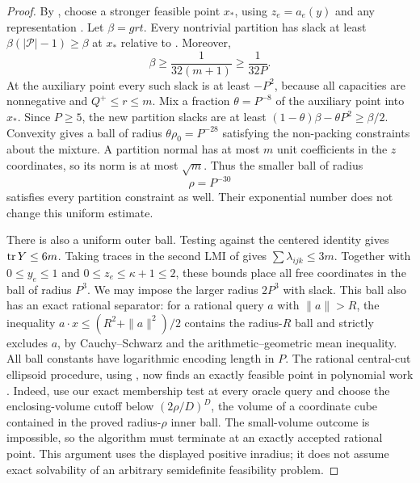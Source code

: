 \begin{proof}
By , choose a stronger feasible point $x_*$,
using $z_e=a_e(y)$ and any representation
. Let $\beta=grt$. Every nontrivial
partition has slack at least $\beta(|\mathcal P|-1)\ge\beta$ at $x_*$
relative to . Moreover,
\[
 \beta\ge\frac1{32(m+1)}\ge\frac1{32P}.
\]
At the auxiliary point every such slack is at least $-P^2$, because
all capacities are nonnegative and $Q^+\le r\le m$.
Mix a fraction $\theta=P^{-8}$ of the auxiliary point into $x_*$.
Since $P\ge5$, the new partition slacks are at least
$(1-\theta)\beta-\theta P^2\ge\beta/2$.
Convexity gives a ball of radius $\theta\rho_0=P^{-28}$ satisfying the
non-packing constraints about the mixture. A partition normal has at
most $m$ unit coefficients in the $z$ coordinates, so its norm is at
most $\sqrt m$. Thus the smaller ball of radius
\begin{equation}
                              \rho=P^{-30}
 \label{eq:ta-inradius}
\end{equation}
satisfies every partition constraint as well. Their exponential number
does not change this uniform estimate.

There is also a uniform outer ball. Testing  against the
centered identity gives $\operatorname{tr} Y\le6m$. Taking traces in the second LMI
of  gives
$\sum\lambda_{ijk}\le3m$. Together with $0\le y_e\le1$ and
$0\le z_e\le\kappa+1\le2$, these bounds place all free coordinates in
the ball of radius $P^3$. We may impose the larger radius $2P^3$ with
slack. This ball also has an exact rational separator: for a rational
query $a$ with $\|a\|>R$, the inequality
$ a\cdot x\le(R^2+\|a\|^2)/2$ contains the radius-$R$ ball
and strictly excludes $a$, by Cauchy--Schwarz and the arithmetic--geometric
mean inequality. All ball constants have logarithmic encoding length in $P$.
The rational central-cut ellipsoid procedure, using
, now finds an exactly feasible point in
polynomial work \cite[Theorem~3.2.1 and its proof]{GLS1988}.
Indeed, use our exact membership test at every oracle query and choose
the enclosing-volume cutoff below $(2\rho/D)^D$, the volume of a
coordinate cube contained in the proved radius-$\rho$ inner ball.
The small-volume outcome is impossible, so the algorithm must terminate
at an exactly accepted rational point. This argument uses the displayed
positive inradius; it does not assume exact solvability of an arbitrary
semidefinite feasibility problem.


\end{proof}
